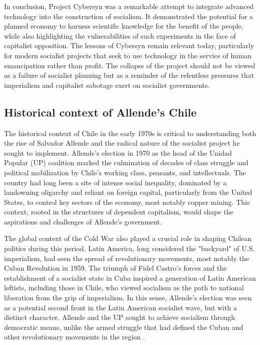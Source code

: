 \begin{refsection}
In conclusion, Project Cybersyn was a remarkable attempt to integrate advanced technology into the construction of socialism. It demonstrated the potential for a planned economy to harness scientific knowledge for the benefit of the people, while also highlighting the vulnerabilities of such experiments in the face of capitalist opposition. The lessons of Cybersyn remain relevant today, particularly for modern socialist projects that seek to use technology in the service of human emancipation rather than profit. The collapse of the project should not be viewed as a failure of socialist planning but as a reminder of the relentless pressures that imperialism and capitalist sabotage exert on socialist governments.

\subsection{Historical context of Allende's Chile}

The historical context of Chile in the early 1970s is critical to understanding both the rise of Salvador Allende and the radical nature of the socialist project he sought to implement. Allende's election in 1970 as the head of the Unidad Popular (UP) coalition marked the culmination of decades of class struggle and political mobilization by Chile's working class, peasants, and intellectuals. The country had long been a site of intense social inequality, dominated by a landowning oligarchy and reliant on foreign capital, particularly from the United States, to control key sectors of the economy, most notably copper mining. This context, rooted in the structures of dependent capitalism, would shape the aspirations and challenges of Allende's government.

The global context of the Cold War also played a crucial role in shaping Chilean politics during this period. Latin America, long considered the "backyard" of U.S. imperialism, had seen the spread of revolutionary movements, most notably the Cuban Revolution in 1959. The triumph of Fidel Castro’s forces and the establishment of a socialist state in Cuba inspired a generation of Latin American leftists, including those in Chile, who viewed socialism as the path to national liberation from the grip of imperialism. In this sense, Allende's election was seen as a potential second front in the Latin American socialist wave, but with a distinct character. Allende and the UP sought to achieve socialism through democratic means, unlike the armed struggle that had defined the Cuban and other revolutionary movements in the region \cite[pp.~45-50]{harmer2011}.


\end{refsection}
